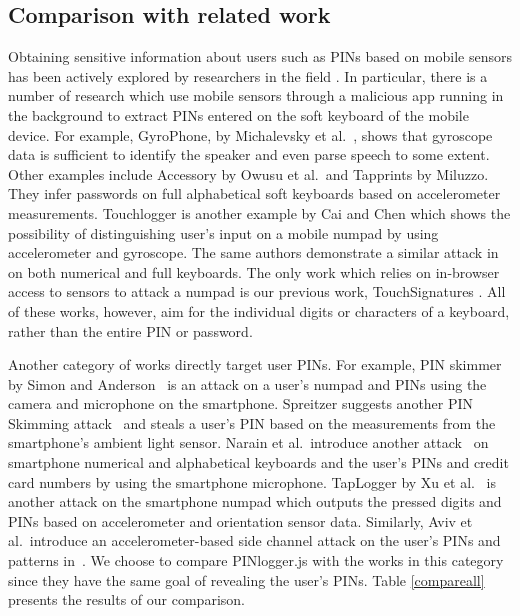 \documentclass[10pt,twocolumn]{article}
\begin{document}
\subsection{Comparison with related work}
\label{comp}
Obtaining sensitive information about users such as PINs based on mobile sensors has been actively explored by researchers in the field \cite{WiFiattack, smartwatch}. 
In particular, there is a number of research which use mobile sensors through a malicious app running in the background to extract PINs entered on the soft keyboard of the mobile device. 
For example, GyroPhone, by Michalevsky et al.~\cite{Speech:Gyr}, shows that gyroscope data is sufficient to identify the speaker and even parse speech to some extent. 
Other examples include Accessory \cite{accessory} by Owusu et al.~and Tapprints \cite{Tapprints} by Miluzzo. They infer passwords on full alphabetical soft keyboards based on accelerometer measurements. Touchlogger \cite{touchlogger} is another example by Cai and Chen \cite{Keystrokes} which shows the possibility of distinguishing user's input on a mobile numpad by using accelerometer and gyroscope. The same authors demonstrate a similar attack in \cite{Motionattack} on both numerical and full keyboards. The only work which relies on in-browser access to sensors to attack a numpad is our previous work, TouchSignatures \cite{Mehrnezhad}. All of these works, however, aim for the individual digits or characters of a keyboard, rather than the entire PIN or password.   

Another category of works directly target user PINs. For example, PIN skimmer by Simon and Anderson~\cite{PINCamera} is an attack on a user's numpad and PINs using the camera and microphone on the smartphone. Spreitzer suggests another PIN Skimming attack~\cite{SkimLight} and steals a user's PIN based on the measurements from the smartphone's ambient light sensor. Narain et al.\ introduce another attack~\cite{KeyMic} on smartphone numerical and alphabetical keyboards and the user's PINs and credit card numbers by using the smartphone microphone. TapLogger by Xu et al.~\cite{taplogger} is another attack on the smartphone numpad which outputs the pressed digits and PINs based on accelerometer and orientation sensor data. Similarly, Aviv et al.\ introduce an accelerometer-based side channel attack on the user's PINs and patterns in~\cite{Tapprints2}. We choose to compare PINlogger.js with the works in this category since they have the same goal of revealing the user's PINs. Table \ref{compareall} presents the results of our comparison. 
\end{document}
